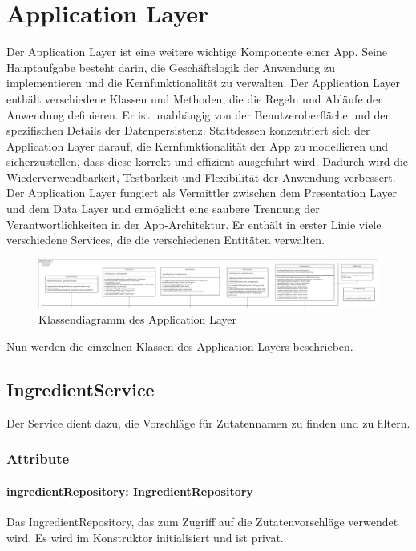 \documentclass[parskip=full]{scrartcl}
\begin{document}
\section{Application Layer}
Der Application Layer ist eine weitere wichtige Komponente einer App. Seine Hauptaufgabe besteht darin, die Geschäftslogik der Anwendung zu implementieren und die Kernfunktionalität zu verwalten. Der Application Layer enthält verschiedene Klassen und Methoden, die die Regeln und Abläufe der Anwendung definieren. Er ist unabhängig von der Benutzeroberfläche und den spezifischen Details der Datenpersistenz. Stattdessen konzentriert sich der Application Layer darauf, die Kernfunktionalität der App zu modellieren und sicherzustellen, dass diese korrekt und effizient ausgeführt wird. Dadurch wird die Wiederverwendbarkeit, Testbarkeit und Flexibilität der Anwendung verbessert. Der Application Layer fungiert als Vermittler zwischen dem Presentation Layer und dem Data Layer und ermöglicht eine saubere Trennung der Verantwortlichkeiten in der App-Architektur. 
Er enthält in erster Linie viele verschiedene Services, die die verschiedenen Entitäten verwalten.
\begin{figure}[htp]
    \centering
    \includegraphics[width = \textwidth]{images/applicationLayer/applicationLayer.pdf}
    \caption{Klassendiagramm des Application Layer}
    \label{fig:application-layer}
\end{figure}

Nun werden die einzelnen Klassen des Application Layers beschrieben.
\newpage
\subsection{IngredientService}
Der Service dient dazu, die Vorschläge für Zutatennamen zu finden und zu filtern.
\subsubsection*{Attribute}
\paragraph{ingredientRepository: IngredientRepository}
Das IngredientRepository, das zum Zugriff auf die Zutatenvorschläge verwendet wird. Es wird im Konstruktor initialisiert und ist privat.
\end{document}
